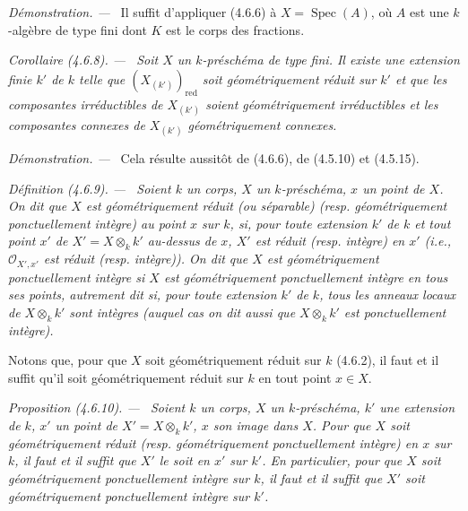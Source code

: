 \documentclass[10pt,oneside]{book}
\newenvironment{definition}[1][]{%
  \par\medskip\noindent\itshape Définition (#1). ---\ }{\par}
\newenvironment{proposition}[1][]{%
  \par\medskip\noindent\itshape Proposition (#1). ---\ }{\par}
\newenvironment{corollary}[1][]{%
  \par\medskip\noindent\itshape Corollaire (#1). ---\ }{\par}
\newenvironment{proof}{%
  \par\medskip\noindent\textit{Démonstration. ---\ }}{\par}
\begin{document}
\begin{proof}
Il suffit d'appliquer (4.6.6) à $X=\operatorname{Spec}(A)$, où $A$ est une
$k$-algèbre de type fini dont $K$ est le corps des fractions.
\end{proof}

\begin{corollary}[4.6.8]
\label{IV.2.4.6.8-fr}
Soit $X$ un $k$-préschéma de type fini. Il existe une extension finie $k'$ de
$k$ telle que $(X_{(k')})_{\mathrm{red}}$ soit géométriquement réduit sur $k'$
et que les composantes irréductibles de $X_{(k')}$ soient géométriquement
irréductibles et les composantes connexes de $X_{(k')}$ géométriquement
connexes.
\end{corollary}

\begin{proof}
Cela résulte aussitôt de (4.6.6), de (4.5.10) et (4.5.15).
\end{proof}

\begin{definition}[4.6.9]
\label{IV.2.4.6.9-fr}
Soient $k$ un corps, $X$ un $k$-préschéma, $x$ un point de $X$. On dit que $X$
est \emph{géométriquement réduit} (ou \emph{séparable}) (resp.
\emph{géométriquement ponctuellement intègre}) au point $x$ sur $k$, si, pour
toute extension $k'$ de $k$ et tout point $x'$ de
$X'=X\otimes_k k'$ au-dessus de $x$, $X'$ est réduit (resp. intègre) en $x'$
(i.e., $\mathcal O_{X',x'}$ est réduit (resp. intègre)). On dit que $X$ est
\emph{géométriquement ponctuellement intègre} si $X$ est géométriquement
ponctuellement intègre en tous ses points, autrement dit si, pour toute
extension $k'$ de $k$, tous les anneaux locaux de $X\otimes_k k'$ sont intègres
(auquel cas on dit aussi que $X\otimes_k k'$ est ponctuellement intègre).
\end{definition}

Notons que, pour que $X$ soit géométriquement réduit sur $k$ (4.6.2), il faut
et il suffit qu'il soit géométriquement réduit sur $k$ en tout point $x\in X$.

\begin{proposition}[4.6.10]
\label{IV.2.4.6.10-fr}
Soient $k$ un corps, $X$ un $k$-préschéma, $k'$ une extension de $k$, $x'$ un
point de $X'=X\otimes_k k'$, $x$ son image dans $X$. Pour que $X$ soit
géométriquement réduit (resp. géométriquement ponctuellement intègre) en $x$
sur $k$, il faut et il suffit que $X'$ le soit en $x'$ sur $k'$. En particulier,
pour que $X$ soit géométriquement ponctuellement intègre sur $k$, il faut et il
suffit que $X'$ soit géométriquement ponctuellement intègre sur $k'$.
\end{proposition}
\end{document}
